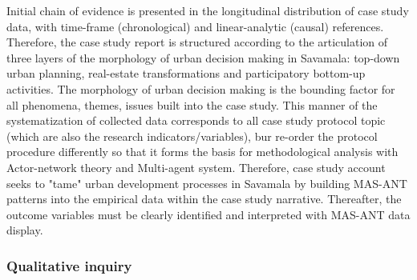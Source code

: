 \documentclass[11pt]{report}
\begin{document}
Initial chain of evidence is presented in the longitudinal distribution of case study data, with time-frame (chronological) and linear-analytic (causal) references. Therefore, the case study report is structured according to the articulation of three layers of the morphology of urban decision making in Savamala: top-down urban planning, real-estate transformations and participatory bottom-up activities. The morphology of urban decision making is the bounding factor for all phenomena, themes, issues built into the case study. This manner of the systematization of collected data corresponds to all case study protocol topic (which are also the research indicators/variables), bur re-order the protocol procedure differently so that it forms the basis for methodological analysis with Actor-network theory and Multi-agent system. Therefore, case study account seeks to "tame" urban development processes in Savamala by building MAS-ANT patterns into the empirical data within the case study narrative. Thereafter, the outcome variables must be clearly identified and interpreted with MAS-ANT data display. 

\subsubsection{Qualitative inquiry}
\end{document}
